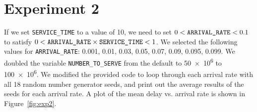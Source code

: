 \section*{Experiment 2}
If we set \texttt{SERVICE\_TIME} to a value of 10, we need to set $0 < \text{\texttt{ARRIVAL\_RATE}} < 0.1$ to satisfy $0 < \text{\texttt{ARRIVAL\_RATE}} \times \text{\texttt{SERVICE\_TIME}} < 1$. We selected the following values for \texttt{ARRIVAL\_RATE}: 0.001, 0.01, 0.03, 0.05, 0.07, 0.09, 0.095, 0.099. We doubled the variable \texttt{NUMBER\_TO\_SERVE} from the default to \num{50e6} to \num{100e6}. We modified the provided code to loop through each arrival rate with all 18 random number generator seeds, and print out the average results of the seeds for each arrival rate.
A plot of the mean delay vs. arrival rate is shown in Figure~\ref{fig:exp2}.

